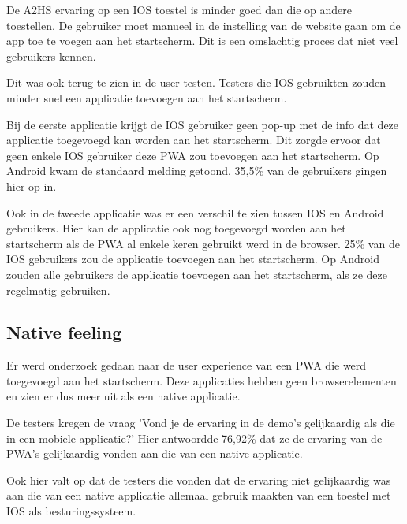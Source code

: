 		De A2HS ervaring op een IOS toestel is minder goed dan die op andere toestellen. De gebruiker moet manueel in de instelling van de website gaan om de app toe te voegen aan het startscherm. Dit is een omslachtig proces dat niet veel gebruikers kennen. 
		
		Dit was ook terug te zien in de user-testen. Testers die IOS gebruikten zouden minder snel een applicatie toevoegen aan het startscherm. 
		
		Bij de eerste applicatie krijgt de IOS gebruiker geen pop-up met de info dat deze applicatie toegevoegd kan worden aan het startscherm. Dit zorgde ervoor dat geen enkele IOS gebruiker deze PWA zou toevoegen aan het startscherm. Op Android kwam de standaard melding getoond, 35,5\% van de gebruikers gingen hier op in.
		
		Ook in de tweede applicatie was er een verschil te zien tussen IOS en Android gebruikers.	
		Hier kan de applicatie ook nog toegevoegd worden aan het startscherm als de PWA al enkele keren gebruikt werd in de browser.
		25\% van de IOS gebruikers zou de applicatie toevoegen aan het startscherm. Op Android zouden alle gebruikers de applicatie toevoegen aan het startscherm, als ze deze regelmatig gebruiken. 
		
		
		
		
	
	\subsection{Native feeling}
		
		Er werd onderzoek gedaan naar de user experience van een PWA die werd toegevoegd aan het startscherm. Deze applicaties hebben geen browserelementen en zien er dus meer uit als een native applicatie.
		
		
		De testers kregen de vraag 'Vond je de ervaring in de demo's gelijkaardig als die in een mobiele applicatie?' Hier antwoordde 76,92\% dat ze de ervaring van de PWA's gelijkaardig vonden aan die van een native applicatie.
		
		Ook hier valt op dat de testers die vonden dat de ervaring niet gelijkaardig was aan die van een native applicatie allemaal gebruik maakten van een toestel met IOS als besturingssysteem.
		

		
	
	
	
	
			
		